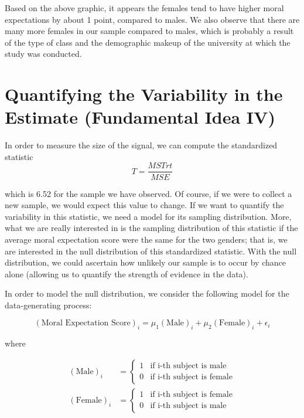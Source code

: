 \documentclass[]{book}
\theoremstyle{plain}
\theoremstyle{mydefn}
\theoremstyle{myexmpl}
\theoremstyle{remark}
\begin{document}
Based on the above graphic, it appears the females tend to have higher
moral expectations by about 1 point, compared to males. We also observe
that there are many more females in our sample compared to males, which
is probably a result of the type of class and the demographic makeup of
the university at which the study was conducted.

\section{Quantifying the Variability in the Estimate (Fundamental Idea
IV)}\label{quantifying-the-variability-in-the-estimate-fundamental-idea-iv-1}

In order to measure the size of the signal, we can compute the
standardized statistic \[T = \frac{MSTrt}{MSE}\]

which is 6.52 for the sample we have observed. Of course, if we were to
collect a new sample, we would expect this value to change. If we want
to quantify the variability in this statistic, we need a model for its
sampling distribution. More, what we are really interested in is the
sampling distribution of this statistic if the average moral expectation
score were the same for the two genders; that is, we are interested in
the null distribution of this standardized statistic. With the null
distribution, we could ascertain how unlikely our sample is to occur by
chance alone (allowing us to quantify the strength of evidence in the
data).

In order to model the null distribution, we consider the following model
for the data-generating process:

\begin{equation}
  (\text{Moral Expectation Score})_i = \mu_1(\text{Male})_i + \mu_2 (\text{Female})_i + \epsilon_i
  \label{eq:anovarecap-model}
\end{equation}

where

\[
\begin{aligned}
  (\text{Male})_i &= \begin{cases}
    1 & \text{if i-th subject is male} \\
    0 & \text{if i-th subject is female} 
    \end{cases} \\
  (\text{Female})_i &= \begin{cases}
    1 & \text{if i-th subject is female} \\
    0 & \text{if i-th subject is male}
    \end{cases}
\end{aligned}
\]
\end{document}
